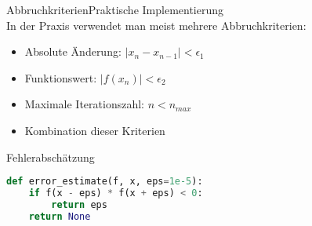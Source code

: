 \begin{remark2}{Abbruchkriterien}{Praktische Implementierung}\\
In der Praxis verwendet man meist mehrere Abbruchkriterien:
\begin{itemize}
    \item Absolute Änderung: $|x_n - x_{n-1}| < \epsilon_1$
    \item Funktionswert: $|f(x_n)| < \epsilon_2$
    \item Maximale Iterationszahl: $n < n_{max}$
    \item Kombination dieser Kriterien
\end{itemize}
\end{remark2}

\begin{examplecode}{Fehlerabschätzung}
    \begin{lstlisting}[language=Python, style=basesmol]
def error_estimate(f, x, eps=1e-5):
    if f(x - eps) * f(x + eps) < 0:
        return eps
    return None
    \end{lstlisting}
\end{examplecode}
